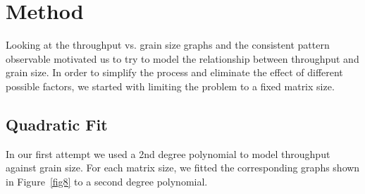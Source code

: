 \vspace{\baselineskip}	
\section{Method}
Looking at the throughput vs. grain size graphs and the consistent pattern observable motivated us to try to model the relationship between throughput and grain size. 
In order to simplify the process and eliminate the effect of different possible factors, we started with limiting the problem to a fixed matrix size. 

\vspace{\baselineskip}	
\subsection{Quadratic Fit}
In our first attempt we used a 2nd degree polynomial to model throughput against grain size. For each matrix size, we fitted the corresponding graphs shown in Figure~\ref{fig8} to a second degree polynomial. 

